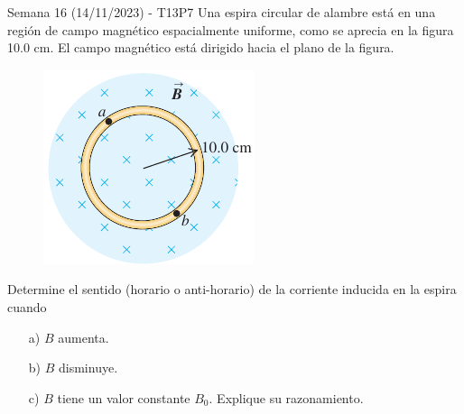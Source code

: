 \begin{frame}{Semana 16 (14/11/2023) - T13P7}
     Una espira circular de alambre está en una región de campo magnético espacialmente uniforme, como se aprecia en la figura 10.0 cm. El campo magnético está dirigido hacia el plano de la figura. 
     
     \begin{figure}
        \centering
        \includegraphics[scale=0.35]{figures/t11p6.png}
    \end{figure}
    
    Determine el sentido (horario o anti-horario) de la corriente inducida en la espira cuando
    
    \begin{itemize}
        \item[a)] $B$ aumenta.
        \item[b)] $B$ disminuye.
        \item[c)] $B$ tiene un valor constante $B_0$. Explique su razonamiento.
    \end{itemize}

\end{frame}


